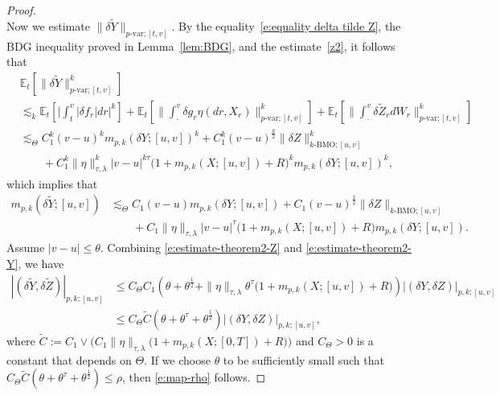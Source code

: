 \documentclass[11pt,reqno]{amsart}
\numberwithin{equation}{section}
\begin{document}
\begin{proof}
\begin{equation}
\end{equation}			
Now we estimate $\|\delta \tilde{Y}\|_{p\text{-var};[t,v]}$. By the equality~\eqref{e:equality delta tilde Z}, the BDG inequality proved in Lemma~\ref{lem:BDG}, and the estimate~\eqref{z2}, it follows that
\begin{equation*}
\begin{aligned}
&\mathbb{E}_{t}\left[\|\delta \tilde{Y}\|^{k}_{p\text{-var};[t,v]}\right]\\
&\lesssim_{k} \mathbb{E}_{t}\left[\Big|\int_{t}^{v}|\delta f_{r}|dr\Big|^{k}\right]+\mathbb{E}_{t}\left[\Big\|\int_{\cdot}^{v}\delta g_{r}\eta(dr,X_{r})\Big\|^{k}_{p\text{-var};[t,v]}\right] + \mathbb{E}_{t}\left[\Big\|\int_{\cdot}^{v}\delta\tilde{Z}_{r}dW_{r}\Big\|^{k}_{p\text{-var};[t,v]}\right]\\
&\lesssim_{\Theta} C_{1}^{k}(v-u)^{k}m_{p,k}(\delta Y;[u,v])^{k} + C_{1}^{k}(v-u)^{\frac{k}{2}}\|\delta Z\|^{k}_{k\text{-BMO};[u,v]} \\
&\quad\quad + C_{1}^{k}\|\eta\|^{k}_{\tau,\lambda}|v-u|^{k\tau}\big(1+m_{p,k}(X;[u,v])+R\big)^{k}m_{p,k}(\delta Y;[u,v])^{k},
\end{aligned}
\end{equation*}
which implies that 
\begin{equation}\label{e:estimate-theorem2-Y}
\begin{aligned}
m_{p,k}(\delta\tilde{Y};[u,v])&\lesssim_{\Theta} C_{1}(v-u)m_{p,k}(\delta Y;[u,v]) + C_{1}(v-u)^{\frac{1}{2}}\|\delta Z\|_{k\text{-BMO};[u,v]} \\
&\quad\quad + C_{1}\|\eta\|_{\tau,\lambda}|v-u|^{\tau}\big(1+m_{p,k}(X;[u,v])+R\big)m_{p,k}(\delta Y;[u,v]).
\end{aligned}
\end{equation}
Assume $|v-u|\le \theta$. Combining \eqref{e:estimate-theorem2-Z} and \eqref{e:estimate-theorem2-Y}, we have
\begin{equation*}
\begin{aligned}|(\delta\tilde{Y},\delta\tilde{Z})|_{p,k;[u,v]}
&\le  C_{\Theta}C_{1}\left(\theta + \theta^{\frac{1}{2}} + \|\eta\|_{\tau,\lambda}\theta^{\tau}\big(1+m_{p,k}(X;[u,v]) + R\big)\right)|(\delta Y,\delta Z)|_{p,k;[u,v]}\\
&\le C_{\Theta}\tilde{C}(\theta + \theta^{\tau} + \theta^{\frac{1}{2}})|(\delta Y,\delta Z)|_{p,k;[u,v]},
\end{aligned}
\end{equation*}
where $\tilde{C} := C_{1}\vee\Big(C_{1}\|\eta\|_{\tau,\lambda}\big(1 + m_{p,k}(X;[0,T]) + R\big)\Big)$ and $C_{\Theta}>0$ is a constant that depends on $\Theta$. If we choose $\theta $ to be sufficiently small such that $ C_{\Theta}\tilde{C}(\theta + \theta^{\tau} + \theta^{\frac{1}{2}}) \le \rho$, then \eqref{e:map-rho} follows. 	
\end{proof}
\end{document}
